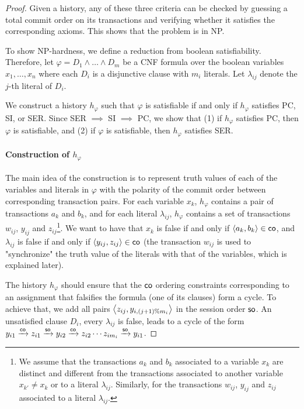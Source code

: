 
\begin{proof}
 Given a history, any of these three criteria %
 can be checked by guessing a total commit order on its transactions and verifying whether it satisfies the corresponding axioms. This shows that the problem is in NP.
 
 To show NP-hardness, we define a reduction from boolean satisfiability. Therefore, let $\varphi=D_1\land\ldots\land D_m$ be a \textsf{CNF} formula over the boolean variables $x_1, \ldots, x_n$ where each $D_i$ is a disjunctive clause with $m_i$ literals.  %
 Let $\lambda_{ij}$ denote the $j$-th literal of $D_i$. 
 
We construct a history $h_\varphi$ such that $\varphi$ is satisfiable if and only if $h_\varphi$ satisfies PC, SI, or SER. Since SER $\implies$ SI $\implies$ PC, we show that (1) if $h_\varphi$ satisfies PC, then $\varphi$ is satisfiable, and (2) if $\varphi$ is satisfiable, then $h_\varphi$ satisfies SER.

\paragraph{Construction of $h_\varphi$}
The main idea of the construction is to represent truth values of each of the variables and literals in $\varphi$ with the polarity of the commit order between corresponding transaction pairs.
For each variable $x_k$, $h_\varphi$ contains a pair of transactions $a_k$ and $b_k$, and for each literal $\lambda_{ij}$, $h_\varphi$ contains a set of transactions $w_{ij}$, $y_{ij}$ and $z_{ij}$\footnote{We assume that the transactions $a_k$ and $b_k$ associated to a variable $x_k$ are distinct and different from the transactions associated to another variable $x_{k'}\neq x_k$ or to a literal $\lambda_{ij}$. Similarly, for the transactions $w_{ij}$, $y_{ij}$ and $z_{ij}$ associated to a literal $\lambda_{ij}$.}. We want to have that $x_k$ is false if and only if ${\left\langle{a_k, b_k}\right\rangle} \in \textsf{co}$, and $\lambda_{ij}$ is false if and only if ${\left\langle{y_{ij}, z_{ij}}\right\rangle} \in \textsf{co}$ (the transaction $w_{ij}$ is used to "synchronize" the truth value of the literals with that of the variables, which is explained later).

The history $h_\varphi$ should ensure that the $\mathsf{co}$ ordering constraints corresponding to an assignment that falsifies the formula (\ie one of its clauses) form a cycle. 
To achieve that, we add all pairs ${\left\langle{z_{ij}, y_{i,(j+1)\% m_i}}\right\rangle}$ in the session order $\mathsf{so}$. An unsatisfied clause $D_i$, \ie every $\lambda_{ij}$ is false, leads to a cycle of the form $y_{i1} \xrightarrow{\textsf{co}} z_{i1} \xrightarrow{\mathsf{so}} y_{i2} \xrightarrow{\mathsf{co}} z_{i2} \cdots z_{i m_i} \xrightarrow{\mathsf{so}} y_{i1}$.


\end{proof}
